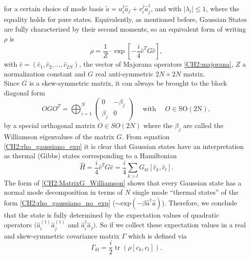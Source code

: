 for a certain choice of mode basis $\tilde{a}=u_{i}^{j}\hat{a}_{j} + v_{i}^{j}\hat{a}_{j}^{\dagger}$, and with $|\lambda_i|\leq 1$, where the equality holds for pure states. Equivalently, as mentioned before, Gaussian States are fully characterized by their second moments, so an equivalent form of writing $\rho$ is
\begin{equation}
\rho= \frac{1}{Z}\cdot \exp \left[-\frac{i}{4} \hat{c}^{T} G \hat{c}\right],
\label{CH2:rho_gaussiano_exp}
\end{equation}
with $\hat{c} = (\hat{c}_1,\hat{c}_2,\ldots,\hat{c}_{2N})$, the vector of Majorana operators \eqref{CH2:majorana}, $Z$ a normalization constant and $G$ real anti-symmetric $2N\times 2N$ matrix. 
\\
Since $G$ is a skew-symmetric matrix, it can always be brought to the block diagonal form 
\begin{equation}
O G O^{T}=\bigoplus_{i=1}^{N}\left(\begin{array}{cc}
0 & -\beta_{j} \\
\beta_{j} & 0
\end{array}\right) \quad \text { with } \quad O \in \mathrm{SO}(2 \mathrm{N}),
\label{CH2:MatrixG_Williamson}
\end{equation}
by a special orthogonal matrix $O\in SO(2N)$ where the $\beta_{j}$ are called the Williamson eigenvalues of the matrix $G$. 
From equation \eqref{CH2:rho_gaussiano_exp} it is clear that Gaussian states have an interpretation as thermal (Gibbs) states corresponding to a Hamiltonian
\begin{equation}
\hat{H}=\frac{i}{4} \hat{c}^{T}G\hat{c}= \frac{i}{4} \sum_{k>l}G_{kl}\left[\hat{c}_{k},\hat{c}_{l}\right].

\end{equation}
The form of \eqref{CH2:MatrixG_Williamson} shows that every Gaussian state has a normal mode decomposition in terms of $N$ single mode ``thermal states'' of the form \eqref{CH2:rho_gaussiano_no_exp} ($\sim \text{exp}(-\beta \hat{a}^{\dagger}\hat{a})$)\cite{kraus_pairing_2009}. Therefore, we conclude that the state is fully determined by the expectation values of quadratic operators $(\hat{a}_i^{(\dagger)}\hat{a}_j^{(\dagger)}$ and  $\hat{a}^{\dagger}_i\hat{a}_j)$. So if we collect these expectation values in a real and skew-symmetric covariance matrix $\Gamma$ which is defined via
\begin{equation}
\Gamma_{k l}=\frac{i}{2} \operatorname{tr}\left(\rho\left[c_{k}, c_{l}\right]\right).
\label{CH2:Cov_matrix_elements}
\end{equation}
